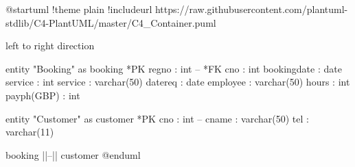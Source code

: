 @startuml
!theme plain
!includeurl https://raw.githubusercontent.com/plantuml-stdlib/C4-PlantUML/master/C4_Container.puml

left to right direction

entity "Booking" as booking {
  *PK regno : int
  --
  *FK cno : int
  bookingdate : date
  service : int
  service : varchar(50)
  datereq : date
  employee : varchar(50)
  hours : int
  payph(GBP) : int
}

entity "Customer" as customer {
  *PK cno : int
  --
  cname : varchar(50)
  tel : varchar(11)
}

booking ||--|| customer
@enduml
